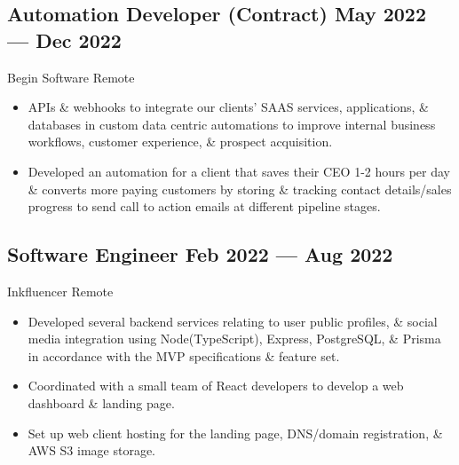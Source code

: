 \documentclass[a4,10pt]{article}
\newcommand{\subtext}[1]{
#1\par\vspace{-0.2cm}}
\newenvironment{zitemize}{
\begin{itemize}\itemsep0pt \parskip0pt \parsep1pt}
{\end{itemize}\vspace{-0.5cm}}
\begin{document}

\subsection*{Automation Developer {\normalsize \normalfont(Contract) } \hfill  May 2022 --- Dec 2022 }
\subtext{Begin Software \hfill Remote }  
    \begin{zitemize}
        \item APIs \& webhooks to integrate our clients' SAAS services, applications, \& databases in custom data centric automations to improve internal business workflows, customer experience, \& prospect acquisition.
        \item Developed an automation for a client that saves their CEO 1-2 hours per day \& converts more paying customers by storing \& tracking contact details/sales progress to send call to action emails at different pipeline stages.
    \end{zitemize}


\subsection*{Software Engineer {\normalsize \normalfont} \hfill  Feb 2022 --- Aug 2022 }
\subtext{Inkfluencer \hfill Remote }  
    \begin{zitemize}
        \item Developed several backend services relating to user public profiles, \& social media integration using Node(TypeScript), Express, PostgreSQL, \& Prisma in accordance with the MVP specifications \& feature set.
        \item Coordinated with a small team of React developers to develop a web dashboard \& landing page.
        \item Set up web client hosting for the landing page, DNS/domain registration, \& AWS S3 image storage.
    \end{zitemize}

\end{document}
